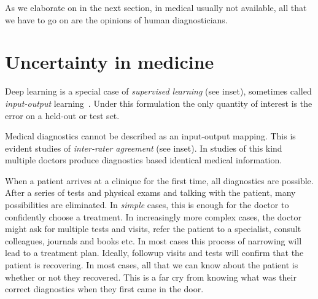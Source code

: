 \documentclass[11pt]{pnas-new}
\begin{document}
As we elaborate on in the next section, in medical 
usually not available, all that we have to go on are the
opinions of human diagnosticians.

\section{Uncertainty in medicine}

  Deep learning is a special case of {\em supervised learning} (see
  inset), sometimes called {\em input-output}
  learning~\cite{ng2016artificial,topol2019deep}.
  Under this formulation the only quantity of interest is the error on
  a held-out or test set.

  Medical diagnostics cannot be described as an input-output
  mapping. This is evident studies of {\em inter-rater agreement} (see
  inset). In studies of this kind multiple doctors produce diagnostics
  based identical medical information.

When a patient arrives at a clinique for the first time, all diagnostics are
possible. After a {\color{blue}series of tests and} physical exams and talking with the patient, many
possibilities are eliminated. In {\em simple} cases, this is enough
for the doctor to confidently choose a treatment. In increasingly more complex
cases, the doctor might ask for multiple tests and visits, refer the
patient to a specialist, consult colleagues, journals and books
etc. In most cases this process of narrowing will lead to a treatment
plan. Ideally, followup visits and tests will confirm that the patient
is recovering. In most cases, all that we can know about the patient
is whether or not they recovered. This is a far cry from knowing what
was their correct diagnostics when they first came in the door.
\end{document}
